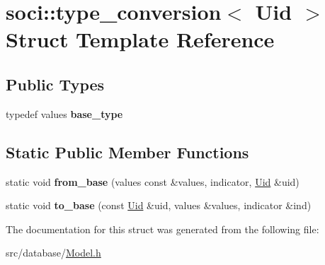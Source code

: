 \hypertarget{structsoci_1_1type__conversion_3_01_uid_01_4}{\section{soci\-:\-:type\-\_\-conversion$<$ Uid $>$ Struct Template Reference}
\label{structsoci_1_1type__conversion_3_01_uid_01_4}
}
\subsection*{Public Types}
\begin{DoxyCompactItemize}
\item 
\hypertarget{structsoci_1_1type__conversion_3_01_uid_01_4_a82c7d64ddd652db1b8950188d29530d7}{typedef values {\bfseries base\-\_\-type}}\label{structsoci_1_1type__conversion_3_01_uid_01_4_a82c7d64ddd652db1b8950188d29530d7}

\end{DoxyCompactItemize}
\subsection*{Static Public Member Functions}
\begin{DoxyCompactItemize}
\item 
\hypertarget{structsoci_1_1type__conversion_3_01_uid_01_4_af829f4838213c4af7657175e6696ba61}{static void {\bfseries from\-\_\-base} (values const \&values, indicator, \hyperlink{struct_uid}{Uid} \&uid)}\label{structsoci_1_1type__conversion_3_01_uid_01_4_af829f4838213c4af7657175e6696ba61}

\item 
\hypertarget{structsoci_1_1type__conversion_3_01_uid_01_4_ad9f63917dd9c2d27e799b18dc3182521}{static void {\bfseries to\-\_\-base} (const \hyperlink{struct_uid}{Uid} \&uid, values \&values, indicator \&ind)}\label{structsoci_1_1type__conversion_3_01_uid_01_4_ad9f63917dd9c2d27e799b18dc3182521}

\end{DoxyCompactItemize}


The documentation for this struct was generated from the following file\-:\begin{DoxyCompactItemize}
\item 
src/database/\hyperlink{_model_8h}{Model.\-h}\end{DoxyCompactItemize}

